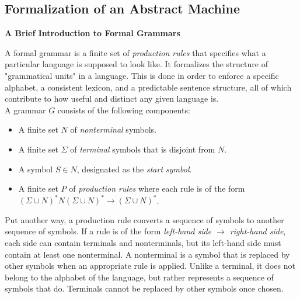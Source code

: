 

\subsection{Formalization of an Abstract Machine}

\begin{tcolorbox}[breakable, enhanced, colback=textbook-blue, sharp corners]
	\vspace{3mm}
	\begin{center}
		\textbf{A Brief Introduction to Formal Grammars}
	\end{center}
	A formal grammar is a finite set of \textit{production rules} that specifies what a particular language is supposed to look like. It formalizes the structure of "grammatical units" in a language. This is done in order to enforce a specific alphabet, a consistent lexicon, and a predictable sentence structure, all of which contribute to how useful and distinct any given language is. \\
	
	A grammar $G$ consists of the following components:
	\begin{itemize}
		\item A finite set $N$ of \textit{nonterminal} symbols.
		\item A finite set $\Sigma$ of \textit{terminal} symbols that is disjoint from $N$.
		\item A symbol $S\in N$, designated as the \textit{start symbol}.
		\item A finite set $P$ of \textit{production rules} where each rule is of the form ${(\Sigma\cup N)^*N(\Sigma\cup N)^*\rightarrow(\Sigma\cup N)^*}$.
	\end{itemize}
	
	Put another way, a production rule converts a sequence of symbols to another sequence of symbols. If a rule is of the form \textit{left-hand side $\rightarrow$ right-hand side}, each side can contain terminals and nonterminals, but its left-hand side must contain at least one nonterminal. A nonterminal is a symbol that is replaced by other symbols when an appropriate rule is applied. Unlike a terminal, it does not belong to the alphabet of the language, but rather represents a sequence of symbols that do. Terminals cannot be replaced by other symbols once chosen. \\
	

\end{tcolorbox}
